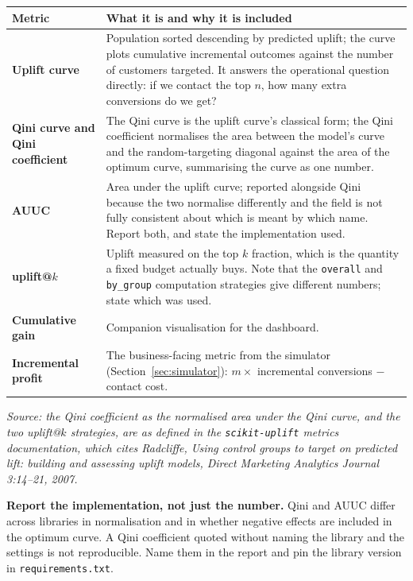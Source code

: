 \documentclass[11pt,a4paper]{article}
\newcommand{\srcnote}[1]{{\footnotesize\itshape\color{teal}Source: #1}}
\begin{document}
\begin{tabularx}{\textwidth}{@{}L{3.6cm}X@{}}
\toprule
\textbf{Metric} & \textbf{What it is and why it is included} \\
\midrule
\textbf{Uplift curve} & Population sorted descending by predicted uplift; the curve plots cumulative
incremental outcomes against the number of customers targeted. It answers the operational question
directly: if we contact the top $n$, how many extra conversions do we get? \\
\textbf{Qini curve and Qini coefficient} & The Qini curve is the uplift curve's classical form; the
Qini coefficient normalises the area between the model's curve and the random-targeting diagonal
against the area of the optimum curve, summarising the curve as one number. \\
\textbf{AUUC} & Area under the uplift curve; reported alongside Qini because the two normalise
differently and the field is not fully consistent about which is meant by which name. Report both,
and state the implementation used. \\
\textbf{uplift@$k$} & Uplift measured on the top $k$ fraction, which is the quantity a fixed budget
actually buys. Note that the \texttt{overall} and \texttt{by\_group} computation strategies give
different numbers; state which was used. \\
\textbf{Cumulative gain} & Companion visualisation for the dashboard. \\
\textbf{Incremental profit} & The business-facing metric from the simulator
(Section~\ref{sec:simulator}): $m \times$ incremental conversions $-$ contact cost. \\
\bottomrule
\end{tabularx}

\srcnote{the Qini coefficient as the normalised area under the Qini curve, and the two uplift@$k$
strategies, are as defined in the \texttt{scikit-uplift} metrics documentation, which cites
Radcliffe, \emph{Using control groups to target on predicted lift: building and assessing uplift
models}, Direct Marketing Analytics Journal 3:14--21, 2007.}

\begin{keybox}
\textbf{Report the implementation, not just the number.} Qini and AUUC differ across libraries in
normalisation and in whether negative effects are included in the optimum curve. A Qini coefficient
quoted without naming the library and the settings is not reproducible. Name them in the report and
pin the library version in \texttt{requirements.txt}.
\end{keybox}
\end{document}
